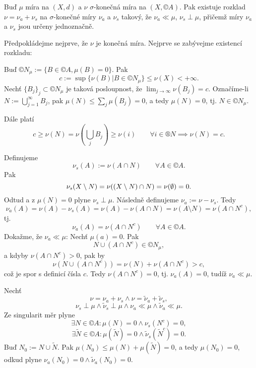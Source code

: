 \documentclass[12pt]{article}					%
\begin{document}

\begin{veta}
	Buď $\mu$ míra na $(X, d)$ a $\nu$ $\sigma$-konečná míra na $(X, ©A)$. Pak existuje rozklad $\nu = \nu_a + \nu_s$ na $\sigma$-konečné míry $\nu_a$ a $\nu_s$ takový, že $\nu_a \ll \mu$, $\nu_s \perp \mu$, přičemž míry $\nu_a$ a $\nu_s$ jsou určeny jednoznačně.

	\begin{dukazin}
		Předpokládejme nejprve, že $\nu$ je konečná míra. Nejprve se zabývejme existencí rozkladu:

		Buď $©N_\mu := \{B \in ©A, \mu(B) = 0\}$. Pak
		$$ c := \sup \{\nu(B) | B \in ©N_\mu\} ≤ \nu(X) < +∞. $$
		Nechť $\{B_j\}_j \subset ©N_\mu$ je taková posloupnost, že $\lim_{j \rightarrow ∞} \nu(B_j) = c$. Označíme-li $N := \bigcup_{j=1}^∞ B_j$, pak $\mu(N) ≤ \sum_j \mu(B_j) = 0$, a tedy $\mu(N) = 0$, tj. $N \in ©N_\mu$.

		Dále platí
		$$ c ≥ \nu(N) = \nu(\bigcup_j B_j) ≥ \nu(i) \qquad \forall i \in ®N \implies \nu(N) = c. $$

		Definujeme
		$$ \nu_s(A) := \nu(A \cap N) \qquad \forall A \in ©A. $$
		Pak
		$$ \nu_s(X \setminus N) = \nu((X \setminus N) \cap N) = \nu(\emptyset) = 0. $$
		Odtud a z $\mu(N) = 0$ plyne $\nu_s \perp \mu$. Následně definujeme $\nu_a := \nu - \nu_s$. Tedy
		$$ \nu_a(A) = \nu(A) - \nu_s(A) = \nu(A) - \nu(A \cap N) = \nu(A \setminus N) = \nu(A \cap N^c), $$
		tj.
		$$ \nu_a(A) = \nu(A \cap N^c) \qquad \forall A \in ©A. $$
		Dokažme, že $\nu_a \ll \mu$: Nechť $\mu(a) = 0$. Pak
		$$ N \cup (A \cap N^c) \in ©N_\mu, $$
		a kdyby $\nu(A \cap N^c) > 0$, pak by
		$$ \nu(N \cup (A \cap N^c)) = \nu(N) + \nu(A \cap N^c) > c, $$
		což je spor s definicí čísla $c$. Tedy $\nu(A \cap N^c) = 0$, tj. $\nu_a(A) = 0$, tudíž $\nu_a \ll \mu$.
	\end{dukazin}

	\begin{dukazin}
		Nechť
		$$ \nu = \nu_a + \nu_s \land \nu = \tilde \nu_a + \tilde \nu_s, $$
		$$ \nu_s \perp \mu \land \tilde \nu_s \perp \mu \land \nu_a \ll \mu \land \tilde \nu_a \ll \mu. $$
		Ze singularit měr plyne
		$$ \exists N \in ©A: \mu(N) = 0 \land \nu_s(N^c) = 0, $$
		$$ \exists \tilde N \in ©A: \mu(\tilde N) = 0 \land \tilde \nu_s(\tilde N^c) = 0. $$
		Buď $N_0 := N \cup \tilde N$. Pak $\mu(N_0) ≤ \mu(N) + \mu(\tilde N) = 0$, a tedy $\mu(N_0) = 0$, odkud plyne $\nu_a(N_0) = 0 \land \tilde \nu_a(N_0) = 0$.


\end{dukazin}
\end{veta}
\end{document}
